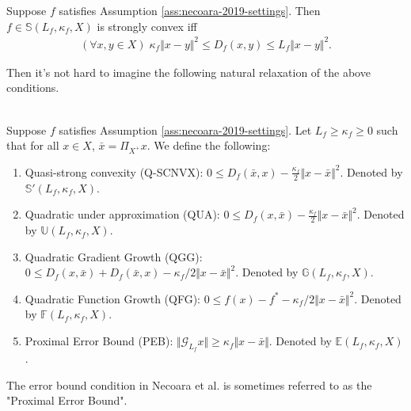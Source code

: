 \documentclass[12pt]{report}
\begin{document}
            \begin{definition}\label{def:necoara-scnvx}
                Suppose $f$ satisfies Assumption \ref{ass:necoara-2019-settings}. 
                Then $f \in \mathbb S(L_f, \kappa_f, X)$ is strongly convex iff 
                \begin{align*}
                    (\forall x, y\in X)\; 
                    \kappa_f \Vert x - y\Vert^2 \le 
                    D_f(x, y) \le L_f \Vert x - y\Vert^2. 
                \end{align*}
            \end{definition}
            Then it's not hard to imagine the following natural relaxation of the above conditions. 
            \begin{definition}\;\\
                Suppose $f$ satisfies Assumption \ref{ass:necoara-2019-settings}.
                \label{def:necoara-weaker-scnvx}
                Let $L_f \ge \kappa_f \ge 0$ such that for all $x \in X$, $\bar x = \Pi_{X^+} x$. 
                We define the following: 
                \begin{enumerate}
                    \item\label{def:neocara-qscnvx} Quasi-strong convexity (Q-SCNVX): $0 \le D_f(\bar x, x) - \frac{\kappa_f}{2}\Vert x - \bar x\Vert^2$. 
                    Denoted by $\mathbb S'(L_f, \kappa_f, X)$. 
                    \item\label{def:necoara-qup} Quadratic under approximation (QUA): $0 \le D_f(x, \bar x) - \frac{\kappa_f}{2}\Vert x - \bar x\Vert^2$. 
                    Denoted by $\mathbb U(L_f, \kappa_f, X)$. 
                    \item\label{def:necoara-qgg} Quadratic Gradient Growth (QGG): $0\le D_f(x, \bar x) + D_f(\bar x, x) - \kappa_f/2\Vert x - \bar x\Vert^2$. 
                    Denoted by $\mathbb G(L_f, \kappa_f, X)$. 
                    \item\label{def:necoara-qfg} Quadratic Function Growth (QFG): $0 \le f(x) - f^* - \kappa_f/2\Vert x - \bar x\Vert^2$. 
                    Denoted by $\mathbb F(L_f, \kappa_f, X)$. 
                    \item\label{def:necoara-peb} Proximal Error Bound (PEB): $\Vert \mathcal G_{L_f}x\Vert \ge \kappa_f\Vert x - \bar x\Vert$. 
                    Denoted by $\mathbb E(L_f, \kappa_f, X)$. 
                \end{enumerate}
            \end{definition}
            \begin{remark}
                The error bound condition in Necoara et al. is sometimes referred to as the "Proximal Error Bound". 
            \end{remark}
\end{document}
